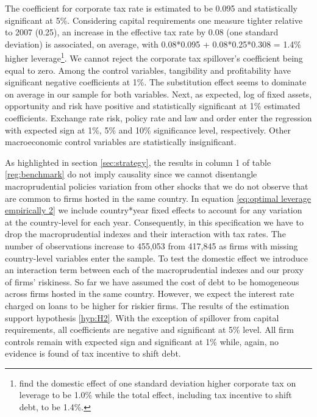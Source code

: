 \documentclass[12pt]{article}
\begin{document}
	 The coefficient for corporate tax rate is estimated to be 0.095 and statistically significant at 5\%. Considering  capital requirements one measure tighter relative to 2007 (0.25), an increase in the effective tax rate by 0.08 (one standard deviation) is associated, on average, with 0.08*0.095 + 0.08*0.25*0.308 = 1.4\% higher leverage\footnote{\cite{huizinga2008capital} find the domestic effect of one standard deviation higher corporate tax on leverage to be 1.0\% while the total effect, including tax incentive to shift debt, to be 1.4\%.}. We cannot reject the corporate tax spillover's coefficient being equal to zero. Among the control variables, tangibility and profitability have significant negative coefficients at 1\%. The substitution effect seems to dominate on average in our sample for both variables. Next, as expected, log of fixed assets, opportunity and risk have positive and statistically significant at 1\% estimated coefficients. Exchange rate risk, policy rate and law and order enter the regression with expected sign at 1\%, 5\% and 10\% significance level, respectively. Other macroeconomic control variables are statistically insignificant.
	 
	 As highlighted in section \ref{sec:strategy}, the results in column 1 of table \ref{reg:benchmark} do not imply causality since we cannot disentangle macroprudential policies variation from other shocks that we do not observe that are common to firms hosted in the same country. In equation \ref{eq:optimal leverage empirically 2} we include country*year fixed effects to account for any variation at the country-level for each year. Consequently, in this specification we have to drop the macroprudential indexes and their interaction with tax rates. The number of observations increase to 455,053 from 417,845 as firms with missing country-level variables enter the sample. To test the domestic effect we introduce an interaction term between each of the macroprudential indexes and our proxy of firms' riskiness. So far we have assumed the cost of debt to be homogeneous across firms hosted in the same country. However, we expect the interest rate charged on loans to be higher for riskier firms. The results of the estimation support hypothesis \ref{hyp:H2}. With the exception of spillover from capital requirements, all coefficients are negative and significant at 5\% level. All firm controls remain with expected sign and significant at 1\% while, again, no evidence is found of tax incentive to shift debt.
	 
\end{document}
